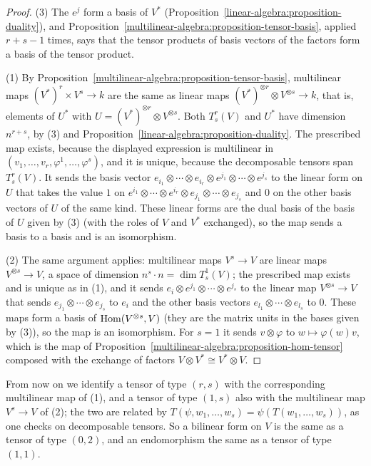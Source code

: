 \begin{proof}
(3) The $e^j$ form a basis of $V^*$ (Proposition~\ref{linear-algebra:proposition-duality}), and Proposition~\ref{multilinear-algebra:proposition-tensor-basis}, applied
$r + s - 1$ times, says that the tensor products of basis vectors of the factors form a basis of the tensor product.

(1) By Proposition~\ref{multilinear-algebra:proposition-tensor-basis}, multilinear maps $(V^*)^r \times V^s \to k$ are the same as linear maps
$(V^*)^{\otimes r} \otimes V^{\otimes s} \to k$, that is, elements of $U^*$ with $U = (V^*)^{\otimes r} \otimes V^{\otimes s}$. Both $T^r_s(V)$ and $U^*$ have dimension $n^{r+s}$,
by (3) and Proposition~\ref{linear-algebra:proposition-duality}. The prescribed map exists, because the displayed expression is multilinear in
$(v_1, \ldots, v_r, \varphi^1, \ldots, \varphi^s)$, and it is unique, because the decomposable tensors span $T^r_s(V)$. It sends the basis vector
$e_{i_1} \otimes \cdots \otimes e_{i_r} \otimes e^{j_1} \otimes \cdots \otimes e^{j_s}$ to the linear form on $U$ that takes the value $1$ on
$e^{i_1} \otimes \cdots \otimes e^{i_r} \otimes e_{j_1} \otimes \cdots \otimes e_{j_s}$ and $0$ on the other basis vectors of $U$ of the same kind. These linear forms are the dual basis of the
basis of $U$ given by (3) (with the roles of $V$ and $V^*$ exchanged), so the map sends a basis to a basis and is an isomorphism.

(2) The same argument applies: multilinear maps $V^s \to V$ are linear maps $V^{\otimes s} \to V$, a space of dimension $n^s \cdot n = \dim T^1_s(V)$; the prescribed map
exists and is unique as in (1), and it sends $e_i \otimes e^{j_1} \otimes \cdots \otimes e^{j_s}$ to the linear map $V^{\otimes s} \to V$ that sends
$e_{j_1} \otimes \cdots \otimes e_{j_s}$ to $e_i$ and the other basis vectors $e_{l_1} \otimes \cdots \otimes e_{l_s}$ to $0$. These maps form a basis of $\operatorname{Hom}(V^{\otimes s}, V)$ (they are the
matrix units in the bases given by (3)), so the map is an isomorphism. For $s = 1$ it sends $v \otimes \varphi$ to $w \mapsto \varphi(w)v$, which is the map of
Proposition~\ref{multilinear-algebra:proposition-hom-tensor} composed with the exchange of factors $V \otimes V^* \cong V^* \otimes V$.
\end{proof}

From now on we identify a tensor of type $(r,s)$ with the corresponding multilinear map of (1), and a tensor of type $(1,s)$ also with the multilinear map
$V^s \to V$ of (2); the two are related by $T(\psi, w_1, \ldots, w_s) = \psi(T(w_1, \ldots, w_s))$, as one checks on decomposable tensors. So a bilinear form on $V$ is
the same as a tensor of type $(0,2)$, and an endomorphism the same as a tensor of type $(1,1)$.

